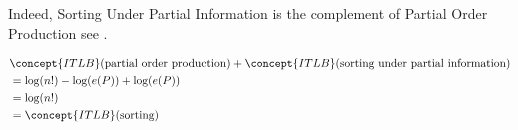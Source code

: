 Indeed, Sorting Under Partial Information is the complement of Partial Order Production see \cite{jcardin1}.

\begin{align*}
& \concept{ITLB}(\text{partial order production}) + \concept{ITLB}(\text{sorting under partial information}) \\
&= \log(n!) - \log(e(P)) + \log(e(P)) \\
&= \log(n!) \\
&= \concept{ITLB}(\text{sorting})
\label{eq:complementarity}
\end{align*}
